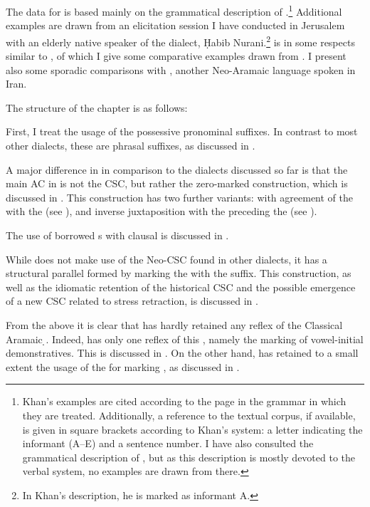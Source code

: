 The data for \JSan is based mainly on the grammatical description of \citet{KhanSanandaj}.\footnote{Khan's examples are cited according to the page in the grammar in which they are treated. Additionally, a reference to the textual corpus, if available, is given in square brackets according to Khan's system: a letter indicating the informant (A--E) and a sentence number. I have also consulted the grammatical description of \citet{SchallerSanandaj}, but as this description is mostly devoted to the verbal system, no examples are drawn from there.} Additional examples are drawn from an elicitation session I have conducted in Jerusalem with an elderly native speaker of the dialect, Ḥabib Nurani.\footnote{In Khan's description, he is marked as informant A.} \JSan is in some respects similar to \JSul, of which I give some comparative examples drawn from \citet{KhanSulemaniyya}. I present also some sporadic comparisons with \NMand, another Neo-Aramaic language spoken in Iran. 

The structure of the chapter is as follows:

First, I treat the usage of the possessive pronominal suffixes. In contrast to most other  dialects, these are phrasal suffixes, as discussed in . 

A major difference in \JSan in comparison  to the dialects discussed so far is that the main AC in \JSan is not the CSC, but rather the zero-marked  construction, which is discussed in . This construction has two further variants:  with agreement of the \secn with the \prim (see ), and {inverse juxtaposition} with the \secn preceding the \prim (see ). 

The use of borrowed  \rel*s with clausal \secns is discussed in .

While \JSan does not make use of the Neo-CSC found in other dialects, it has a structural parallel formed by marking the \prim with the  \ez* suffix. This construction, as well as the idiomatic retention of the historical CSC and the possible emergence of a new CSC related to stress retraction, is discussed in .

From the above it is clear that \JSan has hardly retained any reflex of the Classical Aramaic \d \lnk*. Indeed, \JSan has  only one reflex of this \lnk*, namely the \gen* marking of vowel-initial demonstratives. This is discussed in . On the other hand, \JSan has retained to a small extent the usage of the   for marking \secns, as discussed in .

